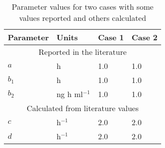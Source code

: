 \documentclass[12pt]{article}
\begin{document}
\begin{table}[htbp]
\begin{center}
\caption{Parameter values for two cases with some values reported and others calculated}
\begin{tabular}{llll}\toprule
Parameter & Units & Case 1 & Case 2 \\ \midrule
\multicolumn{4}{c}{Reported in the literature}\\ \midrule
$a$ & h & 1.0 & 1.0 \\
$b_1$ & h & 1.0  & 1.0 \\
$b_2$ & ng h ml$^{-1}$ & 1.0 & 1.0 \\ \midrule
\multicolumn{4}{c}{Calculated from literature values}\\ \midrule
$c$ & h$^{-1}$ & 2.0 & 2.0  \\
$d$ & h$^{-1}$ & 2.0 & 2.0 \\
\bottomrule
\end{tabular}
\label{table:multicolumn}
\end{center}
\end{table}  
\end{document}
